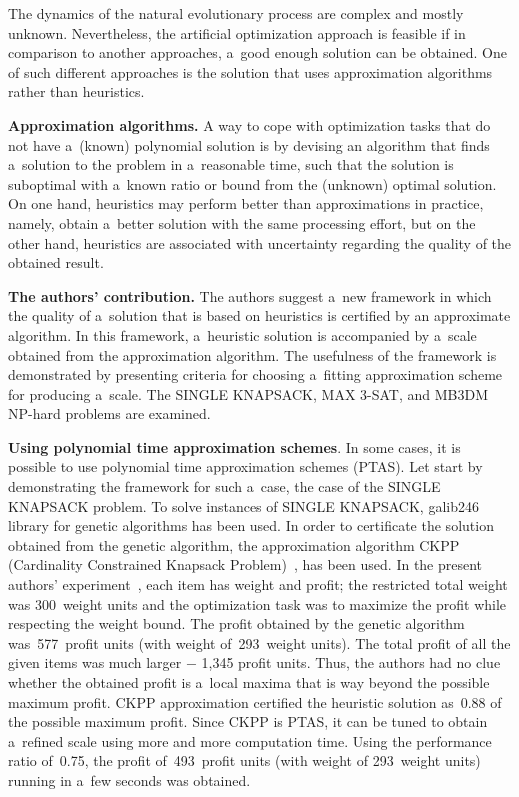 \begin{multicols}{2}
The dynamics of the natural evolutionary process are complex and
mostly unknown. Nevertheless, the artificial optimization approach
is feasible if in comparison to another approaches, a~good enough
solution can be obtained. One of such different approaches is the
solution that uses approximation algorithms rather than
heuristics.

\noindent
\textbf{Approximation algorithms.} A way to cope with
optimization tasks that do not have a~(known) polynomial solution is
by devising an algorithm that finds a~solution to the problem in a~reasonable time, such that the solution is suboptimal with a~known
ratio or bound from the (unknown) optimal solution. On one hand,
heuristics may perform better than approximations in practice,
namely, obtain a~better solution with the same processing effort, but
on the other hand, heuristics are associated with uncertainty
regarding the quality of
the obtained result.

\noindent
\textbf{The authors' contribution.} The authors suggest a~new
framework in which the quality of a~solution that is based on
heuristics is certified by an approximate algorithm. In this
framework, a~heuristic solution is accompanied by a~scale obtained
from the approximation algorithm. The usefulness of
the framework is demonstrated by presenting criteria for choosing a~fitting
approximation scheme for producing a~scale. The
{SINGLE KNAPSACK}, {MAX 3-SAT}, and {MB3DM} NP-hard problems
are examined.

\noindent
\textbf{Using polynomial time approximation schemes}. In some cases,
it is possible to use
polynomial time approximation schemes (PTAS). Let start by
demonstrating the framework for such a~case, the case of the
SINGLE KNAPSACK problem. To solve instances of SINGLE KNAPSACK,
galib246~\cite{GAlib} library for
genetic algorithms has been used. In
order to certificate the solution obtained from the genetic
algorithm, the approximation algorithm CKPP
(Cardinality Constrained Knapsack Problem)~\cite{KPP99}, has been used. In
the present authors'
experiment~\cite{link-to-the-sofware-cite}, each item has weight and
profit; the restricted total weight was 300~weight units and the
optimization task was to maximize the profit while respecting the
weight bound. The profit obtained by the genetic algorithm was~577~profit
units (with weight of~293~weight units). The total profit
of all the given items was much larger $-$ 1,345 profit units. Thus,
the authors had no clue whether the obtained profit is a~local maxima that is
way beyond the possible maximum profit. {CKPP} approximation
certified the heuristic solution as~0.88 of the possible maximum
profit. Since {CKPP} is {PTAS}, it can be tuned to obtain
a~refined scale using more and more computation time. Using the
performance ratio of~0.75,  the profit of~493~profit
units (with weight of 293~weight units) running in a~few seconds was obtained.


\end{multicols}

